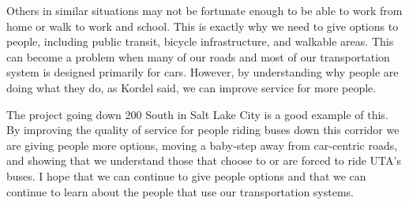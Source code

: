 \documentclass[12pt]{article}
\begin{document}
	Others in similar situations may not be fortunate enough to be able
	to work from home or walk to work and school.
	This is exactly why we need to give options to people,
	including public transit, bicycle infrastructure, and walkable areas.
	This can become a problem when many of our roads
	and most of our transportation system is designed primarily for cars.
	However, by understanding why people are doing what they do,
	as Kordel said, we can improve service for more people.
	
	The project going down 200 South in Salt Lake City is a good example
	of this.
	By improving the quality of service for people riding buses down
	this corridor
	we are giving people more options,
	moving a baby-step away from car-centric roads,
	and showing that we understand those that choose to or are forced
	to ride UTA's buses.
	I hope that we can continue to give people options
	and that we can continue to learn about the people that use our
	transportation systems.
	
\end{document}

